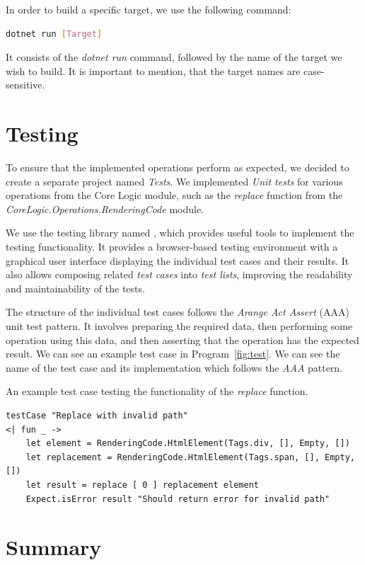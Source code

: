 \noindent In order to build a specific target, we use the following command:
\begin{lstlisting}[language=bash]
  dotnet run [Target] 
\end{lstlisting}
It consists of the \emph{dotnet run} command, followed by the name of the target we wish to build.
It is important to mention, that the target names are case-sensitive.

\medskip
\section{Testing}
\label{sec:testing}
To ensure that the implemented operations perform as expected, we decided to create a separate project named \emph{Tests}.
We implemented \emph{Unit tests} for various operations from the Core Logic module, such as the \emph{replace} function from the \emph{CoreLogic.Operations.RenderingCode} module.

We use the testing library named \citet{mocha}, which provides useful tools to implement the testing functionality.
It provides a browser-based testing environment with a graphical user interface displaying the individual test cases and their results.
It also allows composing related \emph{test cases} into \emph{test lists}, improving the readability and maintainability of the tests.

The structure of the individual test cases follows the \emph{Arange Act Assert} (AAA) unit test pattern.
It involves preparing the required data, then performing some operation using this data, and then asserting that the operation has the expected result.
We can see an example test case in Program~\ref{fig:test}.
We can see the name of the test case and its implementation which follows the \emph{AAA} pattern.

\begin{listing}[htbp]
	\caption{An example test case testing the functionality of the \emph{replace} function.}
	\label{fig:test}
	\begin{lstlisting}
testCase "Replace with invalid path"
<| fun _ ->
    let element = RenderingCode.HtmlElement(Tags.div, [], Empty, [])
    let replacement = RenderingCode.HtmlElement(Tags.span, [], Empty, [])
    let result = replace [ 0 ] replacement element
    Expect.isError result "Should return error for invalid path"
  \end{lstlisting}
\end{listing}

\clearpage
\section{Summary}

